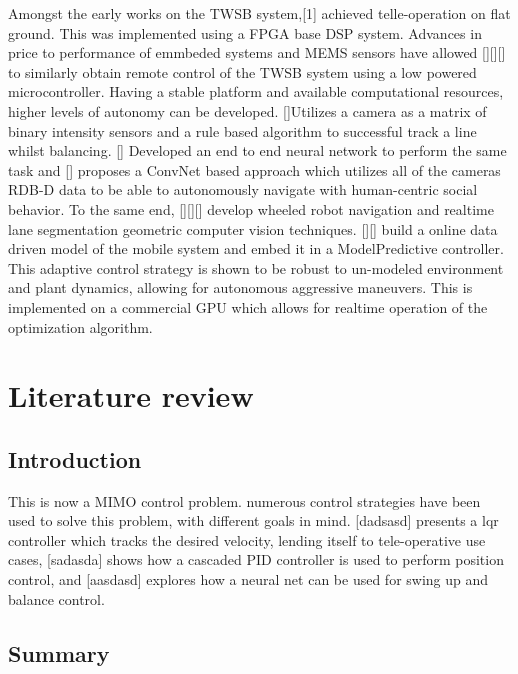     Amongst the early works on the TWSB system,[1] achieved telle-operation on flat ground. 
    This was implemented using a FPGA base DSP system. Advances in price to performance of emmbeded systems and MEMS sensors have allowed 
    [][][] to similarly obtain remote control of the TWSB system using a low powered microcontroller.
    Having a stable platform and available computational resources, higher levels of autonomy can be developed. 
    []Utilizes a camera as a matrix of binary intensity sensors and a rule based algorithm to successful track 
    a line whilst balancing. [] Developed an end to end neural network to perform the same task and [] proposes 
    a ConvNet based approach which utilizes all of the cameras RDB-D data to be able to 
    autonomously navigate with human-centric social behavior. 
    To the same end, [][][] develop wheeled robot navigation and realtime lane segmentation geometric computer vision techniques. 
    [][] build a online data driven model of the mobile system and embed it in a ModelPredictive controller. This adaptive control strategy 
    is shown to be robust to un-modeled environment and plant dynamics, allowing for autonomous aggressive maneuvers. 
    This is implemented on a commercial GPU which allows for realtime operation of the optimization algorithm.
    \pagebreak{}




  \section{Literature review} %

    \subsection{Introduction}

    This is now a MIMO control problem. numerous control strategies have been used to solve this problem, 
    with different goals in mind. [dadsasd] presents a lqr controller which tracks 
    the desired velocity, lending itself to tele-operative use cases, [sadasda] 
    shows how a cascaded PID controller is used to perform position control, 
    and [aasdasd] explores how a neural net can be used for swing up and balance control.
    \subsection{Summary}
  \pagebreak{}
